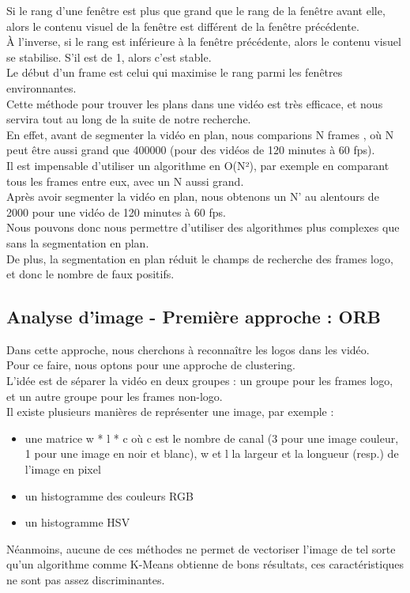 \documentclass[11pt]{article}
\begin{document}
Si le rang d'une fenêtre est plus que grand que le rang de la fenêtre avant elle, alors le contenu visuel de la fenêtre est différent de la fenêtre précédente.\\
À l'inverse, si le rang est inférieure à la fenêtre précédente, alors le contenu visuel se stabilise. S'il est de 1, alors c'est stable.\\

Le début d'un frame est celui qui maximise le rang parmi les fenêtres environnantes.\\

Cette méthode pour trouver les plans dans une vidéo est très efficace, et nous servira tout au long de la suite de notre recherche.\\

En effet, avant de segmenter la vidéo en plan, nous comparions  N frames , où N peut être aussi grand que 400000 (pour des vidéos de 120 minutes à 60 fps).\\
Il est impensable d’utiliser un algorithme en O(N²), par exemple en comparant tous les frames entre eux, avec un N aussi grand.\\

Après avoir segmenter la vidéo en plan, nous obtenons un N’ au alentours de 2000 pour une vidéo de 120 minutes à 60 fps.\\
Nous pouvons donc nous permettre d’utiliser des algorithmes plus complexes que sans la segmentation en plan.\\
De plus, la segmentation en plan réduit le champs de recherche des frames logo, et donc le nombre de faux positifs.\\

\subsection{Analyse d'image - Première approche : ORB}
\label{sec:orgaa3ec74}
Dans cette approche, nous cherchons à reconnaître les logos dans les vidéo.\\
Pour ce faire, nous optons pour une approche de clustering.\\
L'idée est de séparer la vidéo en deux groupes : un groupe pour les frames logo, et un autre groupe pour les frames non-logo.\\

Il existe plusieurs manières de représenter une image, par exemple :\\
\begin{itemize}
\item une matrice w * l * c où c est le nombre de canal (3 pour une image couleur, 1 pour une image en noir et blanc), w et l la largeur et la longueur (resp.) de l'image en pixel\\
\item un histogramme des couleurs RGB\\
\item un histogramme HSV\\
\end{itemize}
Néanmoins, aucune de ces méthodes ne permet de vectoriser l'image de tel sorte qu'un algorithme comme K-Means obtienne de bons résultats, ces caractéristiques ne sont pas assez discriminantes.\\
\end{document}
